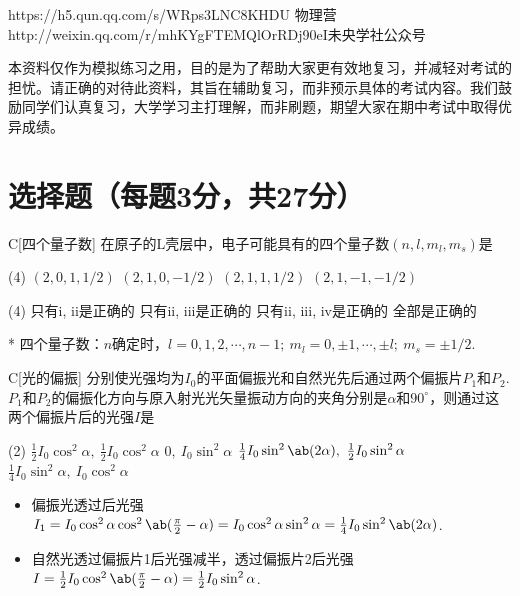 {https://h5.qun.qq.com/s/WRps3LNC8K}{HDU 物理营}
{http://weixin.qq.com/r/mhKYgFTEMQlOrRDj90eI}{未央学社公众号}
\begin{flushleft}
    \kaishu\qquad 本资料仅作为模拟练习之用，目的是为了帮助大家更有效地复习，并减轻对考试的担忧。请正确的对待此资料，其旨在辅助复习，而非预示具体的考试内容。我们鼓励同学们认真复习，大学学习主打理解，而非刷题，期望大家在期中考试中取得优异成绩。
\end{flushleft}

\section{选择题（每题3分，共27分）}
\begin{choice}{C}[四个量子数]
    在原子的L壳层中，电子可能具有的四个量子数$(n,l,m_l,m_s)$是
\begin{tasks}[label=\roman*.](4)
    \task $(2,0,1,1/2)$
    \task $(2,1,0,-1/2)$
    \task $(2,1,1,1/2)$
    \task $(2,1,-1,-1/2)$
\end{tasks}
\begin{tasks}(4)
    \task 只有i, ii是正确的
    \task 只有ii, iii是正确的
    \task 只有ii, iii, iv是正确的
    \task 全部是正确的
\end{tasks}
\end{choice}
\begin{solution}*
    四个量子数：$n$确定时，$l=0,1,2,\cdots,n-1;\ m_l=0,\pm 1,\cdots,\pm l;\ m_s=\pm1/2$.
\end{solution}

\begin{choice}{C}[光的偏振]
分别使光强均为$I_0$的平面偏振光和自然光先后通过两个偏振片$P_1$和$P_2$. $P_1$和$P_2$的偏振化方向与原入射光光矢量振动方向的夹角分别是$\alpha$和$90^{\circ}$，则通过这两个偏振片后的光强$I$是
\begin{tasks}(2)
    \task $\frac{1}{2}I_0\cos^2{\alpha},\ \frac12I_0\cos^2\alpha$
    \task $0,\ I_0\sin^2\alpha$
    \task $\frac{1}{4}I_0\sin^2\ab(2\alpha),\ \frac12I_0\sin^2\alpha$
    \task $\frac{1}{4}I_0\sin^2{\alpha},\ I_0\cos^2\alpha$
\end{tasks}
\end{choice}
\begin{solution}
\begin{itemize}
    \item 偏振光透过后光强$I_1=I_0\cos^2{\alpha}\cos^2{\ab(\frac{\pi}{2}-\alpha)}=I_0\cos^2\alpha\sin^2\alpha=\frac{1}{4}I_0\sin^2{\ab(2\alpha)}$.
    \item 自然光透过偏振片1后光强减半，透过偏振片2后光强$I=\frac12I_0\cos^2\ab(\frac\pi2-\alpha)=\frac12I_0\sin^2\alpha$.
\end{itemize}
\end{solution}

